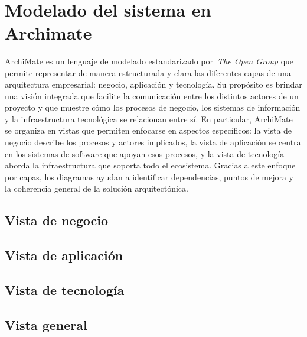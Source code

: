 \label{cap:disenio}
\mbox{}\\
\section{Modelado del sistema en Archimate}
\noindent
ArchiMate es un lenguaje de modelado estandarizado por~\textit{The Open Group} que permite representar de manera estructurada y clara las diferentes capas de una arquitectura empresarial: negocio, aplicación y tecnología. Su propósito es brindar una visión integrada que facilite la comunicación entre los distintos actores de un proyecto y que muestre cómo los procesos de negocio, los sistemas de información y la infraestructura tecnológica se relacionan entre sí.
En particular, ArchiMate se organiza en vistas que permiten enfocarse en aspectos específicos: la vista de negocio describe los procesos y actores implicados, la vista de aplicación se centra en los sistemas de software que apoyan esos procesos, y la vista de tecnología aborda la infraestructura que soporta todo el ecosistema. Gracias a este enfoque por capas, los diagramas ayudan a identificar dependencias, puntos de mejora y la coherencia general de la solución arquitectónica.

\subsection{Vista de negocio}
\noindent


\subsection{Vista de aplicación}
\noindent


\subsection{Vista de tecnología}
\noindent


\subsection{Vista general}
\noindent


